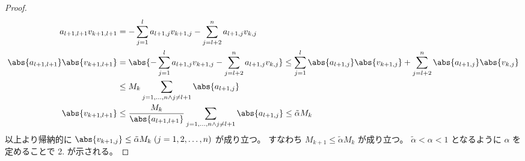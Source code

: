 \begin{proof}
\begin{align*}
                a_{l+1,l+1} v_{k+1, l+1} &= -\sum_{j=1}^l a_{l+1,j} v_{k+1, j} - \sum_{j=l+2}^n a_{l+1,j}v_{k,j} \\
                \abs{a_{l+1,l+1}} \abs{v_{k+1, l+1}} &= \abs{-\sum_{j=1}^l a_{l+1,j} v_{k+1, j} - \sum_{j=l+2}^n a_{l+1,j}v_{k,j}} \leq \sum_{j=1}^l \abs{a_{l+1,j}}\abs{v_{k+1, j}} + \sum_{j=l+2}^n \abs{a_{l+1,j}}\abs{v_{k,j}} \\
                &\leq M_k \sum_{j=1,\dots,n \wedge j\neq l+1} \abs{a_{l+1,j}} \\
                \abs{v_{k+1, l+1}} &\leq \frac{M_k}{\abs{a_{l+1,l+1}}} \sum_{j=1,\dots,n \wedge j\neq l+1} \abs{a_{l+1,j}} \leq \tilde{\alpha} M_k
            \end{align*}
            以上より帰納的に $\abs{v_{k+1,j}} \leq \tilde{\alpha} M_k\;(j=1,2,\dots,n)$ が成り立つ。
            すなわち $M_{k+1} \leq \tilde{\alpha} M_k$ が成り立つ。
            $\tilde{\alpha} < \alpha < 1$ となるように $\alpha $ を定めることで 2. が示される。
        \end{proof}

